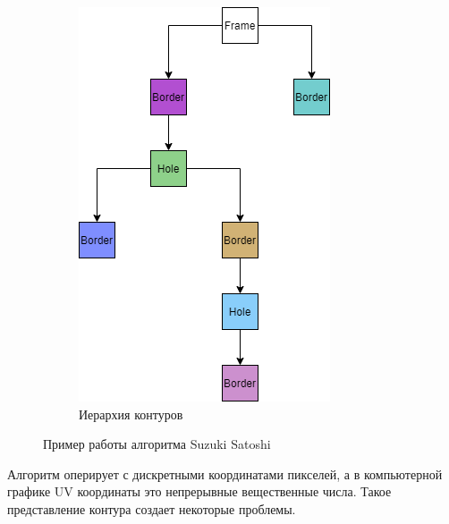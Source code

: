 \documentclass{fefu_thesis/cls/fefu}
\begin{document}
\begin{figure}[H]
\begin{subfigure}[t]{.99\linewidth}
            \includegraphics[scale=0.7]{images/SuzukiExample_hierarchy.png}
            \caption{Иерархия контуров}
        \end{subfigure}
        \caption{Пример работы алгоритма Suzuki Satoshi}
    \end{figure}

    Алгоритм оперирует с дискретными координатами пикселей, а в компьютерной графике UV координаты это непрерывные вещественные числа. Такое представление контура создает некоторые проблемы.
\end{document}
